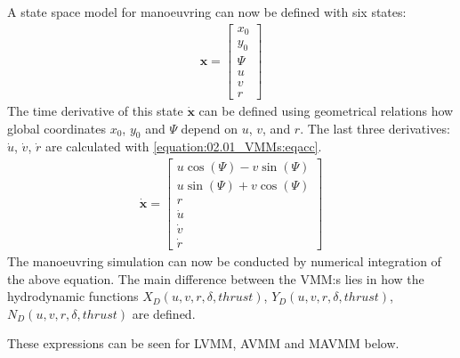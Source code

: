 \documentclass[review]{elsarticle}
\begin{document}
\sphinxAtStartPar
A state space model for manoeuvring can now be defined with six states:
\begin{equation}\label{equation:02.01_VMMs:eq_x}
\begin{split}\displaystyle \mathbf{x} = \left[\begin{matrix}x_{0}\\y_{0}\\\Psi\\u\\v\\r\end{matrix}\right]\end{split}
\end{equation}
\sphinxAtStartPar
The time derivative of this state \(\dot{\mathbf{x}}\) can be defined using geometrical relations how global coordinates \(x_0\), \(y_0\) and \(\Psi\) depend on \(u\), \(v\), and \(r\).
The last three derivatives: \(\dot{u}\), \(\dot{v}\), \(\dot{r}\) are calculated with \autoref{equation:02.01_VMMs:eqacc}.
\begin{equation}\label{equation:02.01_VMMs:eqf}
\begin{split}\displaystyle \dot{\mathbf{x}} = \left[\begin{matrix}u \cos{\left(\Psi \right)} - v \sin{\left(\Psi \right)}\\u \sin{\left(\Psi \right)} + v \cos{\left(\Psi \right)}\\r\\\dot{u}\\\dot{v}\\\dot{r}\end{matrix}\right]\end{split}
\end{equation}
\sphinxAtStartPar
The manoeuvring simulation can now be conducted by numerical integration of the above equation. The main difference between the VMM:s lies in how the hydrodynamic functions \(X_D(u,v,r,\delta,thrust)\), \(Y_D(u,v,r,\delta,thrust)\), \(N_D(u,v,r,\delta,thrust)\) are defined.

\sphinxAtStartPar
These expressions can be seen for LVMM, AVMM and MAVMM below.
\end{document}

